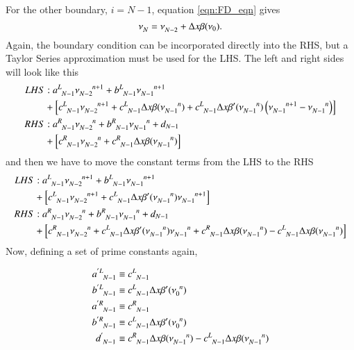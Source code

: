 \documentclass[letterpaper,12pt]{article}
\begin{document}
For the other boundary, $i = N-1$, equation \ref{eqn:FD_eqn} gives
\begin{equation}
  \nu\indices{_{N}} =  \nu\indices{_{N-2}}  + \Delta x \beta(\nu_0).
\end{equation}
Again, the boundary condition can be incorporated directly into the RHS, but a Taylor Series approximation must
be used for the LHS. The left and right sides will look like this
\begin{align}
 LHS&:
  a\indices{^L_{N-1}} \nu\indices{_{N-2}^{n+1}}
+ b\indices{^L_{N-1}} \nu\indices{_{N-1}^{n+1}} \nonumber \\
&+
\left[
  c\indices{^L_{N-1}} \nu\indices{_{N-2}^{n+1}}
+ c\indices{^L_{N-1}} \Delta x \beta (\nu\indices{_{N-1}^{n}})
+ c\indices{^L_{N-1}} \Delta x \beta'(\nu\indices{_{N-1}^{n}})\left(  \nu\indices{_{N-1}^{n+1}} - \nu\indices{_{N-1}^{n}} \right)
\right] \nonumber \\
  RHS&:
  a\indices{^R_{N-1}} \nu\indices{_{N-2}^{n  }}
+ b\indices{^R_{N-1}} \nu\indices{_{N-1}^{n  }}
+ d_{N-1} \nonumber \\
&+ \left[
  c\indices{^R_{N-1}} \nu\indices{_{N-2}^n}                  %
+ c\indices{^R_{N-1}} \Delta x \beta(\nu\indices{_{N-1}^n})  %
\right] \nonumber
\end{align}
and then we have to move the constant terms from the LHS to the RHS
\begin{align}
  \label{eqn:maxLHS}
 LHS&:
  a\indices{^L_{N-1}} \nu\indices{_{N-2}^{n+1}}
+ b\indices{^L_{N-1}} \nu\indices{_{N-1}^{n+1}} \nonumber \\
&+
\left[
  c\indices{^L_{N-1}} \nu\indices{_{N-2}^{n+1}}
+ c\indices{^L_{N-1}} \Delta x \beta'(\nu\indices{_{N-1}^{n}}) \nu\indices{_{N-1}^{n+1}}
\right] \\
  \label{eqn:maxRHS}
  RHS&:
  a\indices{^R_{N-1}} \nu\indices{_{N-2}^{n  }}
+ b\indices{^R_{N-1}} \nu\indices{_{N-1}^{n  }}
+ d_{N-1} \nonumber \\
&+ \left[
  c\indices{^R_{N-1}} \nu\indices{_{N-2}^n}                  %
+ c\indices{^L_{N-1}} \Delta x \beta'(\nu\indices{_{N-1}^{n}}) \nu\indices{_{N-1}^{n}}
+ c\indices{^R_{N-1}} \Delta x \beta(\nu\indices{_{N-1}^n})  %
- c\indices{^L_{N-1}} \Delta x \beta (\nu\indices{_{N-1}^{n}})
\right]
\end{align}
Now, defining a set of prime constants again,

\begin{align}
  a\indices{^{'L}_{N-1}} &\equiv    c\indices{^L_{N-1}} \\
  b\indices{^{'L}_{N-1}} &\equiv    c\indices{^L_{N-1}} \Delta x \beta'(\nu\indices{_0^n}) \\
  a\indices{^{'R}_{N-1}} &\equiv    c\indices{^R_{N-1}} \\
  b\indices{^{'R}_{N-1}} &\equiv    c\indices{^L_{N-1}} \Delta x \beta'(\nu\indices{_0^n}) \\
  d\indices{^{' }_{N-1}} &\equiv    c\indices{^R_{N-1}} \Delta x \beta(\nu\indices{_{N-1}^n}) - c\indices{^L_{N-1}} \Delta x \beta (\nu\indices{_{N-1}^{n}})
\end{align}
\end{document}
